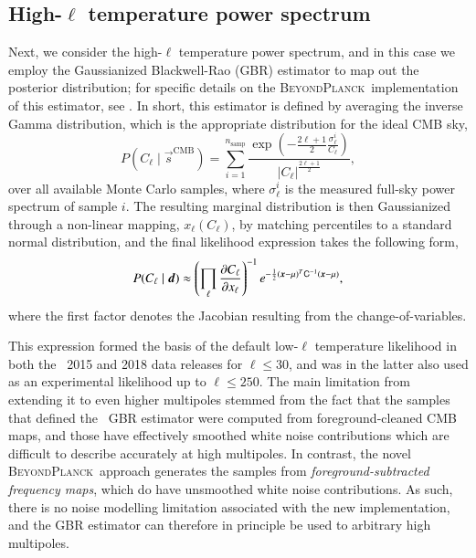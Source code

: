 \documentclass[twocolumn]{aa}
\renewcommand{\d}[0]{\vec{d}}
\newcommand{\s}[0]{\vec{s}}
\newcommand{\x}[0]{\vec{x}}
\newcommand{\Cp}[0]{\tens{C}}
\newcommand{\BP}{\textsc{BeyondPlanck}}
\begin{document}
\subsection{High-$\ell$ temperature power spectrum}
\label{sec:highell_spec}

Next, we consider the high-$\ell$ temperature power spectrum, and in
this case we employ the Gaussianized Blackwell-Rao (GBR) estimator
\citep{chu2005,rudjord:2009,planck2016-l05} to map out the posterior
distribution; for specific details on the
\BP\ implementation of this estimator, see \citet{bp12}. In short,
this estimator is defined by averaging the inverse Gamma distribution,
which is the appropriate distribution  for the ideal CMB sky,
\begin{equation}
  P(C_{\ell}\mid\s^{\mathrm{CMB}}) =
  \sum_{i = 1}^{n_{\mathrm{samp}}} \frac{\exp({-\frac{2\ell+1}{2}\frac{\sigma^i_{\ell}}{C_{\ell}}})}{|C_{\ell}|^{\frac{2\ell+1}{2}}},
\end{equation}
over all available Monte Carlo samples, where $\sigma_{\ell}^{i}$ is
the measured full-sky power spectrum of sample $i$. The resulting
marginal distribution is then Gaussianized through a non-linear
mapping, $x_{\ell}(C_{\ell})$, by matching percentiles to a standard
normal distribution, and the final likelihood expression takes the
following form,
\begin{equation}
  \label{eq:GBR}
  P(C_\ell\mid\d)\approx \left(\prod_\ell\frac{\partial C_\ell}{\partial x_\ell}\right)^{-1} e^{-\frac{1}{2}(\x-\mu)^T\Cp^{-1}(\x-\mu)},
\end{equation}
where the first factor denotes the Jacobian resulting from the
change-of-variables.

This expression formed the basis of the default low-$\ell$ temperature
likelihood in both the \Planck\ 2015 and 2018 data releases
\citep{planck2014-a13,planck2016-l05} for $\ell\le30$, and was in the
latter also used as an experimental likelihood up to $\ell\le250$. The
main limitation from extending it to even higher multipoles stemmed
from the fact that the samples that defined the \Planck\ GBR estimator
were computed from foreground-cleaned CMB maps, and those have
effectively smoothed white noise contributions which are difficult to
describe accurately at high multipoles. In contrast, the novel
\BP\ approach generates the samples from \emph{foreground-subtracted
frequency maps}, which do have unsmoothed white noise
contributions. As such, there is no noise modelling limitation
associated with the new implementation, and the GBR estimator can
therefore in principle be used to arbitrary high multipoles.
\end{document}
